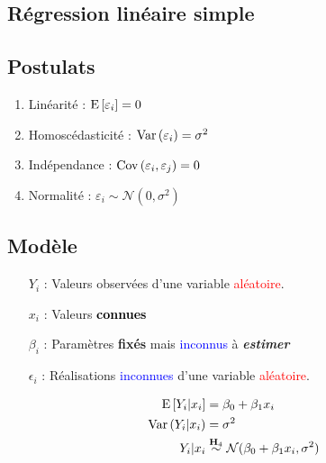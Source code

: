 \documentclass[10pt, french]{article}
\begin{document}
\begin{multicols*}{3} %
\section{Régression linéaire simple}
\subsection*{Postulats}
\begin{enumerate}[label=$\mathbf{H}_{\arabic*}$]
\item Linéarité : $\mathrm{E} \left[ \varepsilon_i \right] = 0$
\item Homoscédasticité : $\mathrm{Var} \left( \varepsilon_i \right)= \sigma^2$
\item Indépendance : $\mathrm{Cov} \left( \varepsilon_i, \varepsilon_j \right) = 0$
\item Normalité : $\varepsilon_i \sim \mathcal{N} (0, \sigma^2)$
\end{enumerate}
\subsection*{Modèle}

\begin{enumerate}
	\item[$Y_i$ : ] Valeurs observées d'une variable \textcolor{red}{aléatoire}.
	\item[$x_i$ : ] Valeurs \textcolor{black}{\textbf{connues}}
	\item[$\beta_i$ : ] Paramètres \textbf{fixés} mais \textcolor{blue}{inconnus} à \textit{\textbf{estimer}}
	\item[$\epsilon_i$ : ] Réalisations \textcolor{blue}{inconnues} d'une variable \textcolor{red}{aléatoire}.
\end{enumerate}

\begin{align*}
\mathrm{E} \left[ Y_i | x_i \right] 	& = \beta_0 + \beta_1 x_i \\
\mathrm{Var} \left( Y_i | x_i \right)	& = \sigma^2 \\
Y_i | x_i & \overset{\mathbf{H}_4}{\sim} \mathcal{N} (\beta_0 + \beta_1 x_i, \sigma^2) 
\end{align*}


\end{multicols*}
\end{document}
